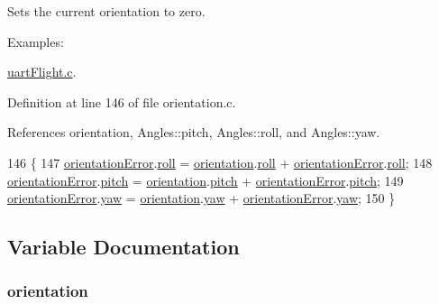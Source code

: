 Sets the current orientation to zero. 

\begin{Desc}
\item[Examples\-: ]\par
\hyperlink{uart_flight_8c-example}{uart\-Flight.\-c}.\end{Desc}


Definition at line 146 of file orientation.\-c.



References orientation, Angles\-::pitch, Angles\-::roll, and Angles\-::yaw.


\begin{DoxyCode}
146                            \{
147     \hyperlink{group__orientation_gab42c272957b0a5cdc11845ade183c2f9}{orientationError}.\hyperlink{struct_angles_a1d3228afa3a1d6773954f40c1e519eb9}{roll} = \hyperlink{group__orientation_gacd4a2942520b68691db5aebde4e537a4}{orientation}.\hyperlink{struct_angles_a1d3228afa3a1d6773954f40c1e519eb9}{roll} + 
      \hyperlink{group__orientation_gab42c272957b0a5cdc11845ade183c2f9}{orientationError}.\hyperlink{struct_angles_a1d3228afa3a1d6773954f40c1e519eb9}{roll};
148     \hyperlink{group__orientation_gab42c272957b0a5cdc11845ade183c2f9}{orientationError}.\hyperlink{struct_angles_a34c057a0378030db67bd6a129f37d938}{pitch} = \hyperlink{group__orientation_gacd4a2942520b68691db5aebde4e537a4}{orientation}.\hyperlink{struct_angles_a34c057a0378030db67bd6a129f37d938}{pitch} + 
      \hyperlink{group__orientation_gab42c272957b0a5cdc11845ade183c2f9}{orientationError}.\hyperlink{struct_angles_a34c057a0378030db67bd6a129f37d938}{pitch};
149     \hyperlink{group__orientation_gab42c272957b0a5cdc11845ade183c2f9}{orientationError}.\hyperlink{struct_angles_a21cd490f6191f66678f55b4c242a10cf}{yaw} = \hyperlink{group__orientation_gacd4a2942520b68691db5aebde4e537a4}{orientation}.\hyperlink{struct_angles_a21cd490f6191f66678f55b4c242a10cf}{yaw} + 
      \hyperlink{group__orientation_gab42c272957b0a5cdc11845ade183c2f9}{orientationError}.\hyperlink{struct_angles_a21cd490f6191f66678f55b4c242a10cf}{yaw};
150 \}
\end{DoxyCode}


\subsection{Variable Documentation}
\hypertarget{group__orientation_gacd4a2942520b68691db5aebde4e537a4}{
\subsubsection[{orientation}]{ orientation}}\label{group__orientation_gacd4a2942520b68691db5aebde4e537a4}


